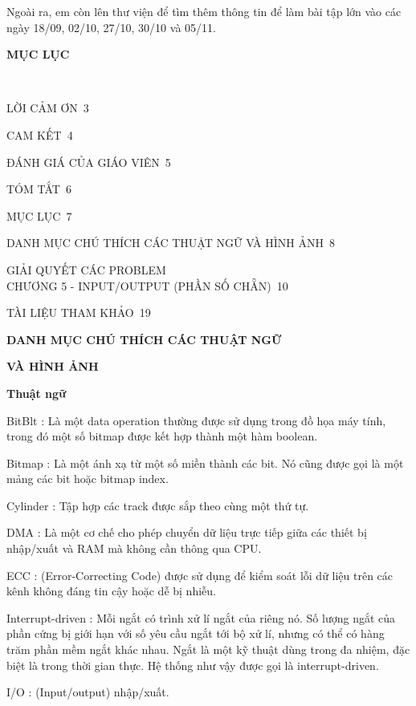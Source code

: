 \documentclass{report}
\begin{document}
Ngoài ra, em còn lên thư viện để tìm thêm thông tin để làm bài tập lớn vào các ngày 18/09, 02/10, 27/10, 30/10 và 05/11.

\newpage
\changefontsizes{16pt}
\centerline{\textbf{MỤC LỤC}}\

\vspace{1.2cm}
\changefontsizes{14pt}
\setlength{\parindent}{0cm}
LỜI CẢM ƠN\dotfill\ 3

\smallskip
CAM KẾT\dotfill\ 4

\smallskip
ĐÁNH GIÁ CỦA GIÁO VIÊN\dotfill\ 5

\smallskip
TÓM TẮT\dotfill\ 6

\smallskip
MỤC LỤC\dotfill\ 7

\smallskip
DANH MỤC CHÚ THÍCH CÁC THUẬT NGỮ VÀ HÌNH ẢNH\dotfill\ 8

\smallskip
GIẢI QUYẾT CÁC PROBLEM\\CHƯƠNG 5 - INPUT/OUTPUT (PHẦN SỐ CHẴN)\dotfill\ 10

TÀI LIỆU THAM KHẢO\dotfill\ 19

\newpage
\changefontsizes{16pt}
\centerline{\textbf{DANH MỤC CHÚ THÍCH CÁC THUẬT NGỮ}}
\centerline{\textbf{VÀ HÌNH ẢNH}}

\vspace{1cm}
\changefontsizes{14pt}
\textbf{Thuật ngữ}

\changefontsizes{13pt}
\bigskip
BitBlt : Là một data operation thường được sử dụng trong đồ họa máy tính, trong đó một số bitmap được kết hợp thành một hàm boolean.

\smallskip
Bitmap : Là một ánh xạ từ một số miền thành các bit. Nó cũng được gọi là một mảng các bit hoặc bitmap index.

\smallskip
Cylinder : Tập hợp các track được sắp theo cùng một thứ tự.

\smallskip
DMA : Là một cơ chế cho phép chuyển dữ liệu trực tiếp giữa các thiết bị nhập/xuất và RAM mà không cần thông qua CPU.

\smallskip
ECC : (Error-Correcting Code) được sử dụng để kiểm soát lỗi dữ liệu trên các kênh không đáng tin cậy hoặc dễ bị nhiễu.

\smallskip
Interrupt-driven : Mỗi ngắt có trình xử lí ngắt của riêng nó. Số lượng ngắt của phần cứng bị giới hạn với số yêu cầu ngắt tới bộ xử lí, nhưng có thể có hàng trăm phần mềm ngắt khác nhau. Ngắt là một kỹ thuật dùng trong đa nhiệm, đặc biệt là trong thời gian thực. Hệ thống như vậy được gọi là interrupt-driven.

\smallskip
I/O : (Input/output) nhập/xuất.
\end{document}
